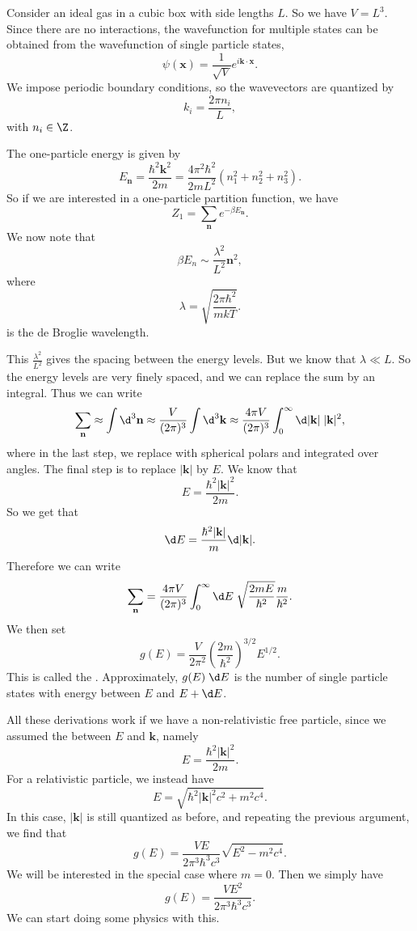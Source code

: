 \documentclass[a4paper]{article}
\begin{document}
Consider an ideal gas in a cubic box with side lengths $L$. So we have $V = L^3$. Since there are no interactions, the wavefunction for multiple states can be obtained from the wavefunction of single particle states,
\[
  \psi(\mathbf{x}) = \frac{1}{\sqrt{V}} e^{i\mathbf{k}\cdot \mathbf{x}}.
\]
We impose periodic boundary conditions, so the wavevectors are quantized by
\[
  k_i = \frac{2\pi n_i}{L},
\]
with $n_i \in \Z$.

The one-particle energy is given by
\[
  E_\mathbf{n} = \frac{\hbar^2 \mathbf{k}^2}{2m} = \frac{4\pi^2 \hbar^2}{2mL^2}(n_1^2 + n_2^2 + n_3^2).
\]
So if we are interested in a one-particle partition function, we have
\[
  Z_1 = \sum_\mathbf{n} e^{-\beta E_\mathbf{n}}.
\]
We now note that
\[
  \beta E_n \sim \frac{\lambda^2}{L^2}\mathbf{n}^2,
\]
where
\[
  \lambda = \sqrt{\frac{2\pi \hbar^2}{mkT}}.
\]
is the de Broglie wavelength.

This $\frac{\lambda^2}{L^2}$ gives the spacing between the energy levels. But we know that $\lambda \ll L$. So the energy levels are very finely spaced, and we can replace the sum by an integral. Thus we can write
\[
  \sum_\mathbf{n} \approx \int \d^3 \mathbf{n} \approx \frac{V}{(2\pi)^3} \int \d^3 \mathbf{k} \approx \frac{4\pi V}{(2\pi)^3} \int_0^\infty \d |\mathbf{k}|\; |\mathbf{k}|^2,
\]
where in the last step, we replace with spherical polars and integrated over angles. The final step is to replace $|\mathbf{k}|$ by $E$. We know that
\[
  E = \frac{\hbar^2 |\mathbf{k}|^2}{2m}.
\]
So we get that
\[
  \d E = \frac{\hbar^2 |\mathbf{k}|}{m} \d |\mathbf{k}|.
\]
Therefore we can write
\[
  \sum_\mathbf{n} = \frac{4\pi V}{(2\pi)^3} \int_0^\infty \d E\; \sqrt{\frac{2mE}{\hbar^2}}\frac{m}{\hbar^2}.
\]
We then set
\[
  g(E) = \frac{V}{2\pi^2} \left(\frac{2m}{\hbar^2}\right)^{3/2} E^{1/2}.
\]
This is called the . Approximately, $g(E) \;\d E$ is the number of single particle states with energy between $E$ and $E + \d E$.

All these derivations work if we have a non-relativistic free particle, since we assumed the  between $E$ and $\mathbf{k}$, namely
\[
  E = \frac{\hbar^2 |\mathbf{k}|^2}{2m}.
\]
For a relativistic particle, we instead have
\[
  E = \sqrt{\hbar^2 |\mathbf{k}|^2 c^2 + m^2c^4}.
\]
In this case, $|\mathbf{k}|$ is still quantized as before, and repeating the previous argument, we find that
\[
  g(E) = \frac{VE}{2\pi^3 \hbar^3 c^3} \sqrt{E^2 - m^2 c^4}.
\]
We will be interested in the special case where $m = 0$. Then we simply have
\[
  g(E) = \frac{VE^2}{2\pi^3 \hbar^3 c^3}.
\]
We can start doing some physics with this.
\end{document}
